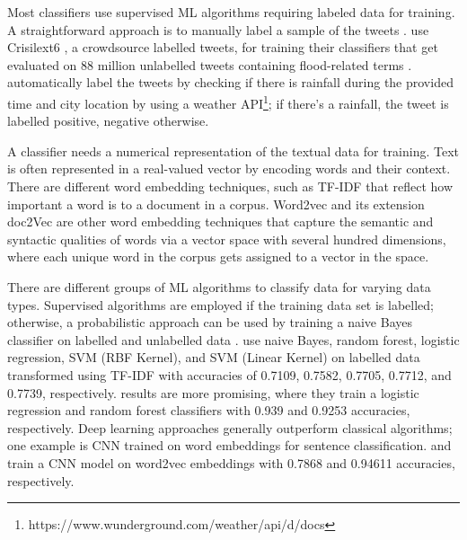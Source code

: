 Most classifiers use supervised \ac{ML} algorithms requiring labeled data for training. A
straightforward approach is to manually label a sample of the tweets
\cite{debruijnGlobalDatabaseHistoric2019b}\cite{barkerDevelopmentNationalscaleRealtime2019}.
 use Crisilext6
\cite{olteanuCrisisLexLexiconCollecting2014}, a crowdsource labelled tweets, for training their
classifiers that get evaluated on 88 million unlabelled tweets containing flood-related terms
\cite{DVN/T3ZFMR_2019}.  automatically label the tweets by
checking if there is rainfall during the provided time and city location by using a weather
\ac{API}\footnote{https://www.wunderground.com/weather/api/d/docs}; if there's a rainfall, the tweet
is labelled positive, negative otherwise.

A classifier needs a numerical representation of the textual data for training. Text is often
represented in a real-valued vector by encoding words and their context. There are different word
embedding techniques, such as \ac{TF-IDF} \cite{enwiki:1123031029} that reflect how important a word
is to a document in a corpus. Word2vec \cite{mikolovEfficientEstimationWord2013} and its extension
doc2Vec \cite{leDistributedRepresentationsSentences2014} are other word embedding techniques that
capture the semantic and syntactic qualities of words via a vector space with several hundred
dimensions, where each unique word in the corpus gets assigned to a vector in the space.

There are different groups of \ac{ML} algorithms to classify data for varying data types. Supervised
algorithms are employed if the training data set is labelled; otherwise, a probabilistic approach
can be used by training a naive Bayes classifier on  labelled and unlabelled data
\cite{liDisasterResponseAided2018}.  use naive Bayes,
random forest, logistic regression, \ac{SVM} (RBF Kernel), and \ac{SVM} (Linear Kernel) on labelled
data transformed using \ac{TF-IDF} with accuracies of 0.7109, 0.7582, 0.7705, 0.7712, and 0.7739,
respectively.  results are more promising,
where they train a logistic regression and random forest classifiers with 0.939 and 0.9253
accuracies, respectively. Deep learning approaches  generally outperform classical algorithms; one
example is \ac{CNN} trained on word embeddings for sentence classification.
 and
 train a \ac{CNN} model on word2vec
embeddings with 0.7868 and 0.94611 accuracies, respectively.

